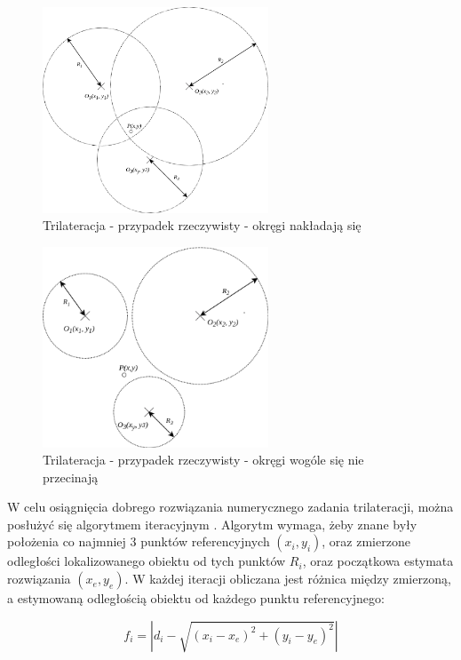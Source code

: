 \begin{figure}[h]
\centering
\includegraphics[width=0.6\textwidth]{img/trilateracja-okregi2.png}
\caption{Trilateracja - przypadek rzeczywisty - okręgi nakładają się}
\label{fig:trilateracja-real1}
\end{figure}

\begin{figure}[h]
\centering
\includegraphics[width=0.6\textwidth]{img/trilateracja-okregi3.png}
\caption{Trilateracja - przypadek rzeczywisty - okręgi wogóle się nie przecinają}
\label{fig:trilateracja-real2}
\end{figure}


W celu osiągnięcia dobrego rozwiązania numerycznego zadania trilateracji, można posłużyć się algorytmem iteracyjnym \cite{trilat_iter}. Algorytm wymaga, żeby znane były położenia co najmniej 3 punktów referencyjnych $(x_i, y_i)$, oraz zmierzone odległości lokalizowanego obiektu od tych punktów $R_i$, oraz początkowa estymata rozwiązania $(x_e, y_e)$. W każdej iteracji obliczana jest różnica między zmierzoną, a estymowaną odległością obiektu od każdego punktu referencyjnego:

\begin{equation}
\label{eq:trilateracja_iter_f}
f_i = | d_i - \sqrt{(x_i - x_e)^2 + (y_i-y_e)^2}|
\end{equation}


